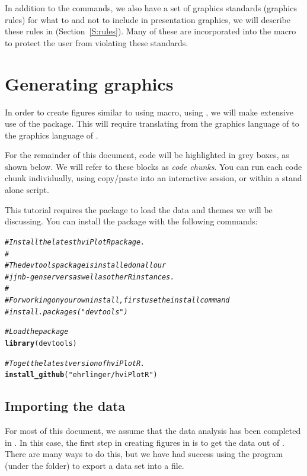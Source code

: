 \documentclass[nojss]{jss}\usepackage[]{graphicx}\usepackage[]{color}
\makeatletter
\newcommand{\hlstr}[1]{\textcolor[rgb]{0.192,0.494,0.8}{#1}}%
\newcommand{\hlcom}[1]{\textcolor[rgb]{0.678,0.584,0.686}{\textit{#1}}}%
\newcommand{\hlstd}[1]{\textcolor[rgb]{0.345,0.345,0.345}{#1}}%
\newcommand{\hlkwd}[1]{\textcolor[rgb]{0.737,0.353,0.396}{\textbf{#1}}}%
\newenvironment{kframe}{%
 \def\at@end@of@kframe{}%
 \ifinner\ifhmode%
  \def\at@end@of@kframe{\end{minipage}}%
  \begin{minipage}{\columnwidth}%
 \fi\fi%
 \def\FrameCommand##1{\hskip\@totalleftmargin \hskip-\fboxsep
 \colorbox{shadecolor}{##1}\hskip-\fboxsep
     \hskip-\linewidth \hskip-\@totalleftmargin \hskip\columnwidth}%
 \MakeFramed {\advance\hsize-\width
   \@totalleftmargin\z@ \linewidth\hsize
   \@setminipage}}%
 {\par\unskip\endMakeFramed%
 \at@end@of@kframe}
\newenvironment{knitrout}{}{} %
\makeatother
\begin{document}
In addition to the  commands, we also have a set of graphics standards (graphics rules) for what to and not to include in presentation graphics, we will describe these rules in (Section~\ref{S:rules}). Many of these are incorporated into the  macro to protect the user from violating these standards.

\section[Generating ggplot2 graphics]{Generating  graphics}\label{S:ggplot2tuple}

In order to create figures similar to using  macro, using , we will make extensive use of the  package. This will require translating from the graphics language of  to the graphics language of . 

For the remainder of this document,  code will be highlighted in grey boxes, as shown below. We will refer to these blocks as \emph{code chunks}. You can run each code chunk individually, using copy/paste into an interactive  session, or within a stand alone  script.

This tutorial requires the  package to load the data and themes we will be discussing. You can install the package with the following commands:
\begin{knitrout}\footnotesize
{}\color{fgcolor}\begin{kframe}
\begin{alltt}
\hlcom{# Install the latest hviPlotR package.}
\hlcom{#}
\hlcom{# The devtools package is installed on all our }
\hlcom{# jjnb-gen servers as well as other R instances.}
\hlcom{#}
\hlcom{# For working on your own install, first use the install command}
\hlcom{# install.packages("devtools")}

\hlcom{# Load the package}
\hlkwd{library}\hlstd{(devtools)}

\hlcom{# To get the latest version of hviPlotR.}
\hlkwd{install_github}\hlstd{(}\hlstr{"ehrlinger/hviPlotR"}\hlstd{)}
\end{alltt}
\end{kframe}
\end{knitrout}

\subsection{Importing the data}\label{S:sasData}
For most of this document, we assume that the data analysis has been completed in . In this case, the first step in creating figures in  is to get the data out of . There are many ways to do this, but we have had success using the  program (under the  folder) to export a data set into a   file.
\end{document}
